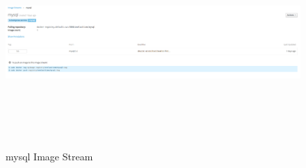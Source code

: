 \documentclass[11pt]{report}
\begin{document}
\begin{itemize}
\begin{figure}[h!]
	\end{figure}
		\ \\
		\pagebreak
		\ \\
			\begin{figure}[h!]
    	\begin{center}
    	   			\includegraphics[width=16cm,height=8cm]{imagexample.png}
    		\caption{mysql Image Stream}
    	  \end{center}
	  
	\end{figure}
	
		
		\vspace{1cm}
		\ \\
	\end{itemize}
\end{document}

